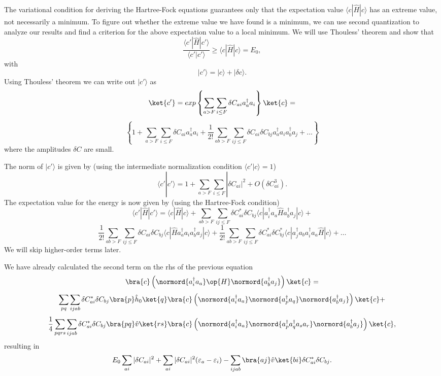 The variational condition for deriving the Hartree-Fock equations guarantees only that the expectation value
$\langle c | \hat{H} | c \rangle$ has an extreme value, not necessarily a minimum. To figure out whether the extreme value we have found  is a minimum, we can use second quantization to analyze our results and find a criterion 
for the above expectation value to a local minimum. We will use Thouless' theorem and show that
\[
\frac{\langle c' |\hat{H} | c'\rangle}{\langle c' |c'\rangle} \ge \langle c |\hat{H} | c\rangle= E_0,
\]
with 
\[
|c'\rangle = |c\rangle + |\delta c\rangle.
\]
Using Thouless' theorem we can write out $|c'\rangle$ as
\[
\ket{c'}=exp\left\{\sum_{a>F}
\sum_{i\le F}\delta C_{ai}a_{a}^{\dagger}
a_{i}\right\}\ket{c}=
\]
\[
\left\{1+\sum_{a>F}\sum_{i\le F}\delta C_{ai}a_{a}^{\dagger}
a_{i}+\frac{1}{2!}\sum_{ab>F}
\sum_{ij\le F}\delta C_{ai}\delta C_{bj}a_{a}^{\dagger}a_{i}a_{b}^{\dagger}a_{j}+\dots\right\}
\]
where the amplitudes $\delta C$ are small.

The norm of $|c'\rangle$ is given by (using the intermediate normalization condition $\langle c' |c\rangle=1$) 
\[
\langle c' | c'\rangle = 1+\sum_{a>F}
\sum_{i\le F}|\delta C_{ai}|^2+O(\delta C_{ai}^3).
\]
The expectation value for the energy is now given by (using the Hartree-Fock condition)
\[
\langle c' |\hat{H} | c'\rangle=\langle c |\hat{H} | c\rangle +
\sum_{ab>F}
\sum_{ij\le F}\delta C_{ai}^*\delta C_{bj}\langle c |a_{i}^{\dagger}a_{a}\hat{H}a_{b}^{\dagger}a_{j}|c\rangle+
\]
\[
\frac{1}{2!}\sum_{ab>F}
\sum_{ij\le F}\delta C_{ai}\delta C_{bj}\langle c |\hat{H}a_{a}^{\dagger}a_{i}a_{b}^{\dagger}a_{j}|c\rangle+\frac{1}{2!}\sum_{ab>F}
\sum_{ij\le F}\delta C_{ai}^*\delta C_{bj}^*\langle c|a_{j}^{\dagger}a_{b}a_{i}^{\dagger}a_{a}\hat{H}|c\rangle
+\dots
\] 
We will skip higher-order terms later.

We have already calculated the second term on the rhs of the previous equation
\[
\bra{c} \left(\normord{a^\dagger_i a_a} \op{H} \normord{a^\dagger_b a_j} \right) \ket{c} =
\]
\[
\sum_{pq} \sum_{ijab}\delta C_{ai}^*\delta C_{bj} \bra{p}\hat{h}_0\ket{q} 
            \bra{c} \left(\normord{a^\dagger_i a_a}\normord{a^\dagger_pa_q} 
             \normord{a^\dagger_b a_j} \right)\ket{c}+ 
\]
\[
\frac{1}{4} \sum_{pqrs} \sum_{ijab}\delta C_{ai}^*\delta C_{bj} \bra{pq}\hat{v}\ket{rs} 
            \bra{c} \left(\normord{a^\dagger_i a_a}\normord{a^\dagger_p a^\dagger_q a_s  a_r} \normord{a^\dagger_b a_j} \right)\ket{c},
\]
resulting in
\[
E_0\sum_{ai}|\delta C_{ai}|^2+\sum_{ai}|\delta C_{ai}|^2(\varepsilon_a-\varepsilon_i)-\sum_{ijab} \bra{aj}\hat{v}\ket{bi}\delta C_{ai}^*\delta C_{bj}.
\]

